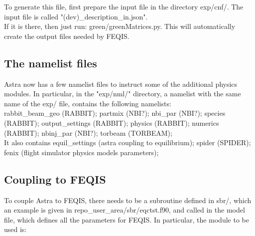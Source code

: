 \documentclass[12pt]{article}
\begin{document}
To generate this file, first prepare the input file in the directory exp/cnf/.
The input file is called "(dev)\_description\_in.json". \\
If it is there, then just run: green/greenMatrices.py. This will automatically create the output files needed by FEQIS.
\subsection{The namelist files}
Astra now has a few namelist files to instruct some of the additional physics modules.
In particular, in the "exp/nml/" directory, a namelist with the same name of the exp/ file, contains the following namelists:\\
rabbit\_beam\_geo (RABBIT); partmix (NBI?); nbi\_par (NBI?); species (RABBIT); output\_settings (RABBIT); physics (RABBIT); numerics (RABBIT); nbinj\_par (NBI?); torbeam (TORBEAM); \\
It also contains equil\_settings (astra coupling to equilibrium);  spider (SPIDER); fenix (flight simulator physics models parameters);

\subsection{Coupling to FEQIS}
To couple Astra to FEQIS, there needs to be a subroutine defined in sbr/, which an example is given in repo\_user\_area/sbr/eqctst.f90, and called in the model file, which defines all the parameters for FEQIS.
In particular, the module to be used is:
\end{document}

